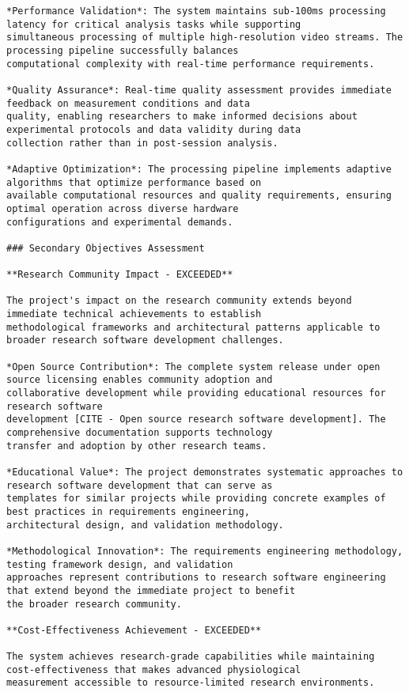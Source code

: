 \documentclass[11pt,a4paper]{report}
\begin{document}
\begin{verbatim}
*Performance Validation*: The system maintains sub-100ms processing latency for critical analysis tasks while supporting
simultaneous processing of multiple high-resolution video streams. The processing pipeline successfully balances
computational complexity with real-time performance requirements.

*Quality Assurance*: Real-time quality assessment provides immediate feedback on measurement conditions and data
quality, enabling researchers to make informed decisions about experimental protocols and data validity during data
collection rather than in post-session analysis.

*Adaptive Optimization*: The processing pipeline implements adaptive algorithms that optimize performance based on
available computational resources and quality requirements, ensuring optimal operation across diverse hardware
configurations and experimental demands.

### Secondary Objectives Assessment

**Research Community Impact - EXCEEDED**

The project's impact on the research community extends beyond immediate technical achievements to establish
methodological frameworks and architectural patterns applicable to broader research software development challenges.

*Open Source Contribution*: The complete system release under open source licensing enables community adoption and
collaborative development while providing educational resources for research software
development [CITE - Open source research software development]. The comprehensive documentation supports technology
transfer and adoption by other research teams.

*Educational Value*: The project demonstrates systematic approaches to research software development that can serve as
templates for similar projects while providing concrete examples of best practices in requirements engineering,
architectural design, and validation methodology.

*Methodological Innovation*: The requirements engineering methodology, testing framework design, and validation
approaches represent contributions to research software engineering that extend beyond the immediate project to benefit
the broader research community.

**Cost-Effectiveness Achievement - EXCEEDED**

The system achieves research-grade capabilities while maintaining cost-effectiveness that makes advanced physiological
measurement accessible to resource-limited research environments.


\end{verbatim}
\end{document}
